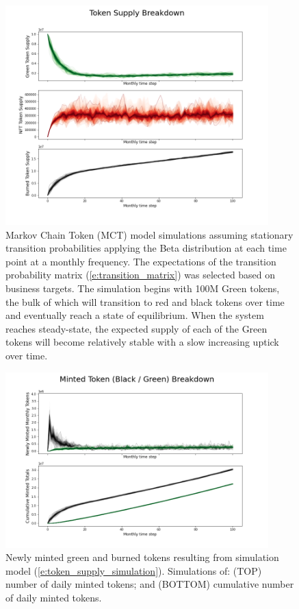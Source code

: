 \documentclass{article}
\begin{document}
\begin{figure}
\centering
\includegraphics[width=4in]{token_supply_sims.png}
\caption{Markov Chain Token (MCT) model simulations assuming stationary transition probabilities applying the Beta distribution at each time point at a monthly frequency. The expectations of the transition probability matrix (\ref{e:transition_matrix}) was selected based on business targets. The simulation begins with 100M Green tokens, the bulk of which will transition to red and black tokens over time and eventually reach a state of equilibrium. When the system reaches steady-state, the expected supply of each of the Green tokens will become relatively stable with a slow increasing uptick over time.} 
\label{fig:token_supply_sims}
\end{figure} 

\begin{figure}
\centering
\includegraphics[width=4in]{burned_minted.png}
\caption{Newly minted green and burned tokens resulting from simulation model (\ref{e:token_supply_simulation}). Simulations of: (TOP) number of daily minted tokens; and (BOTTOM) cumulative number of daily minted tokens.} 
\label{fig:burned_minted}
\end{figure} 
\end{document}
